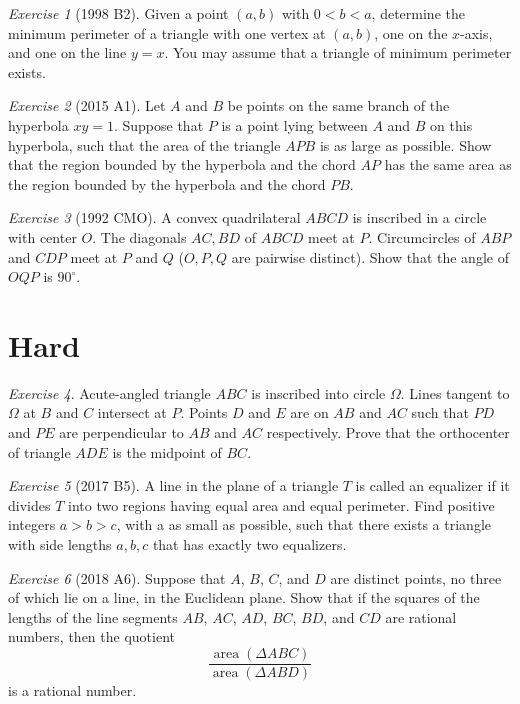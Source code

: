 \documentclass{article}
\theoremstyle{definition}
\theoremstyle{remark}
\newtheorem{exercise}{Exercise}
\DeclareMathOperator{\area}{area}
\begin{document}
\begin{exercise}[1998 B2]
Given a point $(a, b)$ with $0 < b < a$, determine the minimum perimeter of a triangle with one vertex at $(a, b)$, one on the $x$-axis, and one on the line $y = x$. You may assume that a triangle of minimum perimeter exists.
\end{exercise}

\begin{exercise}[2015 A1]
Let $A$ and $B$ be points on the same branch of the hyperbola $xy = 1$. Suppose that $P$ is a point lying between $A$ and $B$ on this hyperbola, such that the area of the triangle $APB$ is as large as possible. Show that the region bounded by the hyperbola and the chord $AP$ has the same area as the region bounded by the hyperbola and the chord $PB$.
\end{exercise}

\begin{exercise}[1992 CMO]
A convex quadrilateral $ABCD$ is inscribed in a circle with center $O$. The diagonals $AC, BD$ of $ABCD$ meet at $P$. Circumcircles of $ABP$ and $CDP$ meet at $P$ and $Q$ ($O, P, Q$ are pairwise distinct). Show that the angle of $OQP$ is $90^{\circ}$. 
\end{exercise}

\section{Hard}
\begin{exercise}
Acute-angled triangle $ABC$ is inscribed into circle $\Omega$. Lines tangent to $\Omega$ at $B$ and $C$ intersect at $P$. Points $D$ and $E$ are on $AB$ and $AC$ such that $PD$ and $PE$ are perpendicular to $AB$ and $AC$ respectively. Prove that the orthocenter of triangle $ADE$ is the midpoint of $BC$.
\end{exercise}

\begin{exercise}[2017 B5]
A line in the plane of a triangle $T$ is called an equalizer if it divides $T$ into two regions having equal area and equal perimeter. Find positive integers $a > b > c$, with a as small as possible, such that there exists a triangle with side lengths $a, b, c$ that has exactly two equalizers.
\end{exercise}

\begin{exercise}[2018 A6]
Suppose that $A$, $B$, $C$, and $D$ are distinct points, no three of which lie on a line, in the Euclidean plane. Show that if the squares of the lengths of the line segments $AB$, $AC$, $AD$, $BC$, $BD$, and $CD$ are rational numbers, then the quotient
\[\frac{\area(\Delta ABC)}{\area(\Delta ABD)}\]
is a rational number.
\end{exercise}
\end{document}
